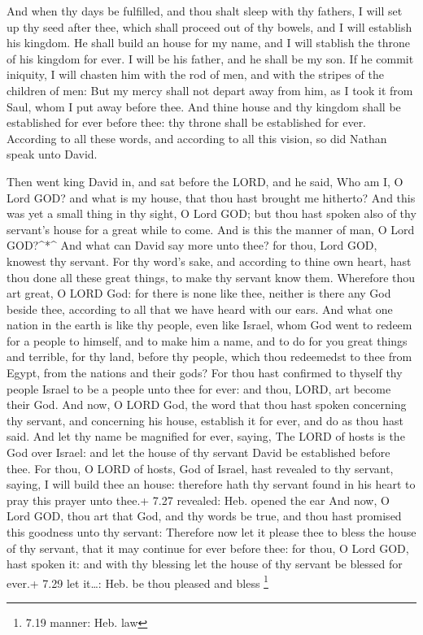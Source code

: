  And when thy days be fulfilled, and thou shalt sleep with
thy fathers, I will set up thy seed after thee, which shall proceed out
of thy bowels, and I will establish his kingdom.  He shall
build an house for my name, and I will stablish the throne of his
kingdom for ever.  I will be his father, and he shall be my
son. If he commit iniquity, I will chasten him with the rod of men, and
with the stripes of the children of men:  But my mercy
shall not depart away from him, as I took it from Saul, whom I put away
before thee.  And thine house and thy kingdom shall be
established for ever before thee: thy throne shall be established for
ever.  According to all these words, and according to all
this vision, so did Nathan speak unto David.

 Then went king David in, and sat before the LORD, and he
said, Who am I, O Lord GOD? and what is my house, that thou hast brought
me hitherto?  And this was yet a small thing in thy sight,
O Lord GOD; but thou hast spoken also of thy servant's house for a great
while to come. And is this the manner of man, O Lord GOD?\^{}*\^{}
 And what can David say more unto thee? for thou, Lord GOD,
knowest thy servant.  For thy word's sake, and according to
thine own heart, hast thou done all these great things, to make thy
servant know them.  Wherefore thou art great, O LORD God:
for there is none like thee, neither is there any God beside thee,
according to all that we have heard with our ears.  And
what one nation in the earth is like thy people, even like Israel, whom
God went to redeem for a people to himself, and to make him a name, and
to do for you great things and terrible, for thy land, before thy
people, which thou redeemedst to thee from Egypt, from the nations and
their gods?  For thou hast confirmed to thyself thy people
Israel to be a people unto thee for ever: and thou, LORD, art become
their God.  And now, O LORD God, the word that thou hast
spoken concerning thy servant, and concerning his house, establish it
for ever, and do as thou hast said.  And let thy name be
magnified for ever, saying, The LORD of hosts is the God over Israel:
and let the house of thy servant David be established before thee.
 For thou, O LORD of hosts, God of Israel, hast revealed to
thy servant, saying, I will build thee an house: therefore hath thy
servant found in his heart to pray this prayer unto thee.+ 7.27
revealed: Heb. opened the ear  And now, O Lord GOD, thou
art that God, and thy words be true, and thou hast promised this
goodness unto thy servant:  Therefore now let it please
thee to bless the house of thy servant, that it may continue for ever
before thee: for thou, O Lord GOD, hast spoken it: and with thy blessing
let the house of thy servant be blessed for ever.+ 7.29 let it\ldots:
Heb. be thou pleased and bless \footnote{7.19 manner: Heb. law}

